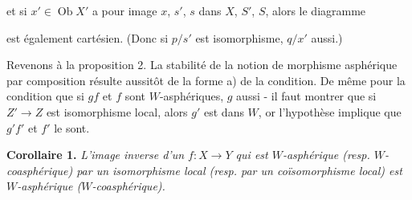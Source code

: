 \documentclass[11pt]{article}
\newcommand{\printedpage}[1]{\marginpar{\footnotesize p.~#1}}
\newcommand{\msp}[1]{\marginpar{\footnotesize [#1]}}
\newcommand{\Ob}{\operatorname{Ob}}
\begin{document}
\begin{center}
\end{center}

et si $x' \in \Ob X'$ a pour image $x$, $s'$, $s$ dans $X$, $S'$, $S$, alors le diagramme

\begin{center}
\end{center}

est également cartésien. (Donc si $p/s'$ est isomorphisme, $q/x'$ aussi.)

\printedpage{21}

\msp{page 25}Revenons à la proposition 2. La stabilité de la notion de morphisme asphérique par composition résulte aussitôt de la forme a) de la condition. De même pour la condition que si $gf$ et $f$ sont $W$-asphériques, $g$ aussi - il faut montrer que si $Z' \longrightarrow Z$ est isomorphisme local, alors $g'$ est dans $W$, or l'hypothèse implique que $g'f'$ et $f'$ le sont.

\begin{center}
\end{center}

\textbf{Corollaire 1.} \textit{L'image inverse d'un $f : X \longrightarrow Y$ qui est $W$-asphérique (resp. $W$-coasphérique) par un isomorphisme local (resp. par un coïsomorphisme local) est $W$-asphérique ($W$-coasphérique).}

\begin{center}
\end{center}
\end{document}
